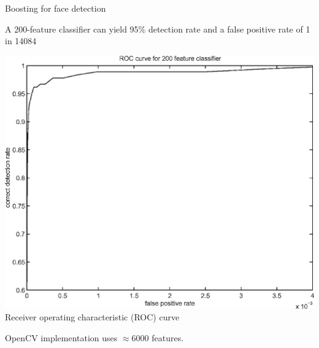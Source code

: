 \documentclass[compress]{beamer}
\begin{document}
\begin{frame}{Boosting for face detection}

A 200-feature classifier can yield 95\% detection rate and a false
positive rate of 1 in 14084

    \begin{center}
        \includegraphics[width=0.5\linewidth]{viola-jones-adaboost-roc}
        Receiver operating characteristic (ROC) curve
    \end{center}

    OpenCV implementation uses $\approx 6000$ features.
\end{frame}
\end{document}
